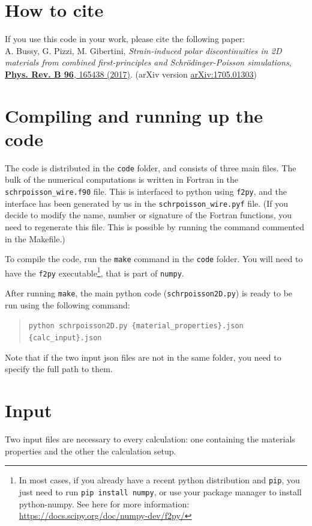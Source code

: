 \documentclass[a4paper,12pt]{article}
\begin{document}
\section{How to cite}
If you use this code in your work, please cite the following paper: \\
A. Bussy, G. Pizzi, M. Gibertini, \emph{Strain-induced polar discontinuities in 2D materials from combined first-principles and Schr\"odinger-Poisson simulations}, \underline{\href{http://doi.org/10.1103/PhysRevB.96.165438}{\textbf{Phys. Rev. B 96}, 165438 (2017)}}. 
(arXiv version \underline{\href{http://arxiv.org/abs/1705.01303}{arXiv:1705.01303}})

\section{Compiling and running up the code}
The code is distributed in the \texttt{code} folder, and consists of three main files.
The bulk of the numerical computations is written in Fortran in the  \texttt{schrpoisson\_wire.f90} file. This is interfaced to python using \texttt{f2py}, and the interface has been generated by us in the \texttt{schrpoisson\_wire.pyf} file. (If you decide to modify the name, number or signature of the Fortran functions, you need to regenerate this file. This is possible by running the command commented in the Makefile.)

To compile the code, run the \texttt{make} command in the \texttt{code} folder.
You will need to have the \texttt{f2py} executable\footnote{In most cases, if you already have a recent python distribution and \texttt{pip}, you just need to run \texttt{pip install numpy}, or use your package manager to install python-numpy. See here for more information: \url{https://docs.scipy.org/doc/numpy-dev/f2py/}}, that is part of \texttt{numpy}. 

After running \texttt{make}, the main python code (\texttt{schrpoisson2D.py}) is ready to be run using the following command:

\begin{quote}
\texttt{python schrpoisson2D.py \{material\_properties\}.json  \{calc\_input\}.json}
\end{quote}

Note that if the two input json files are not in the same folder, you need to specify the full path to them.

\section{\label{sec:input}Input}
Two input files are necessary to every calculation: one containing the materials properties and the other the calculation setup. 
\end{document}

